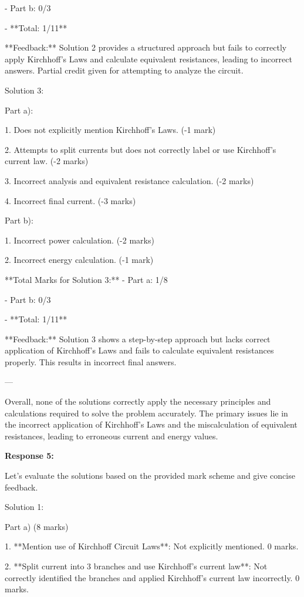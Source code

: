 \documentclass[a4paper,11pt]{article}
\begin{document}
- Part b: 0/3

- **Total: 1/11**

**Feedback:** Solution 2 provides a structured approach but fails to correctly apply Kirchhoff’s Laws and calculate equivalent resistances, leading to incorrect answers. Partial credit given for attempting to analyze the circuit.

Solution 3:

Part a):

1. Does not explicitly mention Kirchhoff’s Laws. (-1 mark)

2. Attempts to split currents but does not correctly label or use Kirchhoff’s current law. (-2 marks)

3. Incorrect analysis and equivalent resistance calculation. (-2 marks)

4. Incorrect final current. (-3 marks)

Part b):

1. Incorrect power calculation. (-2 marks)

2. Incorrect energy calculation. (-1 mark)

**Total Marks for Solution 3:**
- Part a: 1/8

- Part b: 0/3

- **Total: 1/11**

**Feedback:** Solution 3 shows a step-by-step approach but lacks correct application of Kirchhoff’s Laws and fails to calculate equivalent resistances properly. This results in incorrect final answers.

---

Overall, none of the solutions correctly apply the necessary principles and calculations required to solve the problem accurately. The primary issues lie in the incorrect application of Kirchhoff’s Laws and the miscalculation of equivalent resistances, leading to erroneous current and energy values.

\bigskip
\textbf{Response 5:}

Let's evaluate the solutions based on the provided mark scheme and give concise feedback.

Solution 1:

Part a) (8 marks)

1. **Mention use of Kirchhoff Circuit Laws**: Not explicitly mentioned. \(0\) marks.

2. **Split current into 3 branches and use Kirchhoff’s current law**: Not correctly identified the branches and applied Kirchhoff’s current law incorrectly. \(0\) marks.
\end{document}

